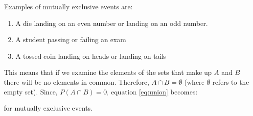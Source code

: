 \documentclass[10pt,a4paper,titlepage,twoside,openright]{report}
\begin{document}
Examples of mutually exclusive events are:
\begin{enumerate}
\item A die landing on an even number or landing on an odd number.
\item A student passing or failing an exam
\item A tossed coin landing on heads or landing on tails
\end{enumerate}

This means that if we examine the elements of the sets that make up $A$ and $B$ there will be no elements in common. Therefore, $A \cap B =\emptyset$ (where $\emptyset$ refers to the empty set). Since, $P(A \cap B)=0$, equation \ref{eq:union} becomes:

 for mutually exclusive events.
\end{document}
